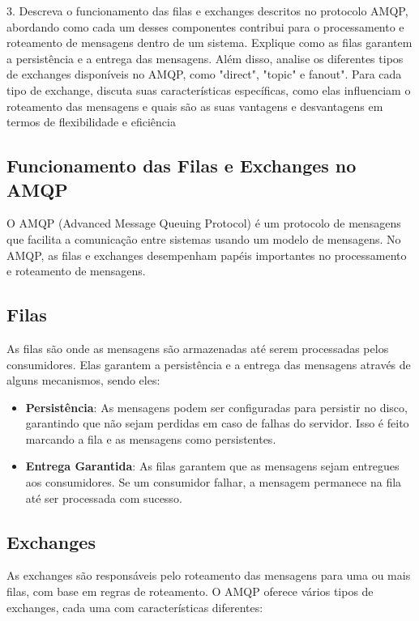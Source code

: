 \documentclass{article}
\begin{document}
		\noindent\large{3. Descreva o funcionamento das filas e exchanges descritos no protocolo AMQP, abordando como cada um desses componentes contribui para o processamento e roteamento de mensagens dentro de um sistema. Explique como as filas garantem a persistência e a entrega das mensagens. Além disso, analise os diferentes tipos de exchanges disponíveis no AMQP, como "direct", "topic" e fanout". Para cada tipo de exchange, discuta suas características específicas, como elas influenciam o roteamento das mensagens e quais são as suas vantagens e desvantagens em termos de flexibilidade e eficiência}
	
	
	\subsection*{Funcionamento das Filas e Exchanges no AMQP}
	
	O AMQP (Advanced Message Queuing Protocol) é um protocolo de mensagens que facilita a comunicação entre sistemas usando um modelo de mensagens. No AMQP, as filas e exchanges desempenham papéis importantes no processamento e roteamento de mensagens.
	
	\subsection*{Filas}
	
	As filas são onde as mensagens são armazenadas até serem processadas pelos consumidores. Elas garantem a persistência e a entrega das mensagens através de alguns mecanismos, sendo eles:
	
	\begin{itemize}
		\item \textbf{Persistência}: As mensagens podem ser configuradas para persistir no disco, garantindo que não sejam perdidas em caso de falhas do servidor. Isso é feito marcando a fila e as mensagens como persistentes.
		\item \textbf{Entrega Garantida}: As filas garantem que as mensagens sejam entregues aos consumidores. Se um consumidor falhar, a mensagem permanece na fila até ser processada com sucesso.
	\end{itemize}
	
	\subsection*{Exchanges}
	
	As exchanges são responsáveis pelo roteamento das mensagens para uma ou mais filas, com base em regras de roteamento. O AMQP oferece vários tipos de exchanges, cada uma com características diferentes:
	
\end{document}
